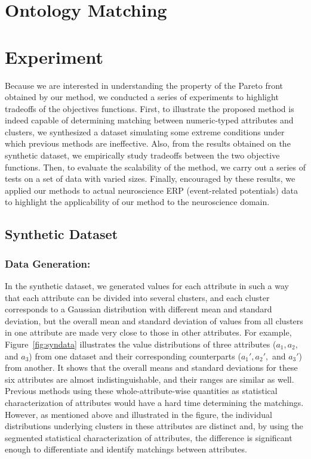 \section{Ontology Matching}
\section{Experiment}
\label{sec:experiment}
Because we are interested in understanding the property of the Pareto front obtained by our method, we conducted a series of experiments to highlight tradeoffs of the objectives functions. First, to illustrate the proposed method is indeed capable of determining matching between numeric-typed attributes and clusters, we synthesized a dataset simulating some extreme conditions under which previous methods are ineffective. Also, from the results obtained on the synthetic dataset, we empirically study tradeoffs between the two objective functions. Then, to evaluate the scalability of the method, we carry out a series of tests on a set of data with varied sizes. Finally, encouraged by these results, we applied our methods to actual neuroscience ERP (event-related potentials) data to highlight the applicability of our method to the neuroscience domain.

\subsection{Synthetic Dataset}
\label{sec:syn_exp}
\subsubsection{Data Generation:}
In the synthetic dataset, we generated values for each attribute in such a way that each attribute can be divided into several clusters, and each cluster corresponds to a Gaussian distribution with different mean and standard deviation, but the overall mean and standard deviation of values from all clusters in one attribute are made very close to those in other attributes. For example, Figure~\ref{fig:syndata} illustrates the value distributions of three attributes ($a_1, a_2,$ and $a_3$) from one dataset and their corresponding counterparts ($a_1', a_2',$ and $a_3'$) from another. It shows that the overall means and standard deviations for these six attributes are almost indistinguishable, and their ranges are similar as well. Previous methods using these whole-attribute-wise quantities as statistical characterization of attributes would have a hard time determining the matchings. However, as mentioned above and illustrated in the figure, the individual distributions underlying clusters in these attributes are distinct and, by using the segmented statistical characterization of attributes, the difference is significant enough to differentiate and identify matchings between attributes.

